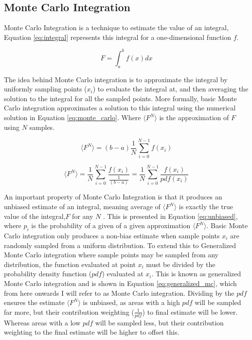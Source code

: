 \documentclass[../dissertation.tex]{subfiles}
\begin{document}
\subsection{Monte Carlo Integration}
\label{sec:monte_carlo_approx}
 Monte Carlo Integration is a technique to estimate the value of an integral, Equation \ref{eq:integral} represents this integral for a one-dimensional function $f$.

\begin{equation}
\label{eq:integral}
F = \int_a^b f(x) dx
\end{equation}

The idea behind Monte Carlo integration is to approximate the integral by uniformly sampling points ($x_i$) to evaluate the integral at, and then averaging the solution to the integral for all the sampled points. More formally, basic Monte Carlo integration approximates a solution to this integral using the numerical solution in Equation \ref{eq:monte_carlo}. Where $\langle F^N \rangle$ is the approximation of $F$ using $N$ samples.

\begin{equation}
\label{eq:monte_carlo}
\langle F^N \rangle = (b - a) \frac{1}{N} \sum^{N-1}_{i=0} f(x_i)
\end{equation}

\begin{equation}
\label{eq:generalized_mc}
\langle F^N \rangle = \frac{1}{N} \sum^{N-1}_{i=0} \frac{f(x_i)}{\frac{1}{(b-a)}} 
 = \frac{1}{N} \sum^{N-1}_{i=0} \frac{f(x_i)}{pdf(x_i)}
\end{equation}

An important property of Monte Carlo Integration is that it produces an unbiased estimate of an integral, meaning average of $\langle F^N \rangle$ is exactly the true value of the integral,$F$ for any $N$ \cite{morokoff1995quasi}. This is presented in Equation \ref{eq:unbiased}, where $p_i$ is the probability of a given of a given approximation $\langle F^N \rangle$. Basic Monte Carlo integration only produces a non-bias estimate when sample points $x_i$ are randomly sampled from a uniform distribution. To extend this to Generalized Monte Carlo integration where sample points may be sampled from any distribution, the function evaluated at point $x_i$ must be divided by the probability density function ($pdf$) evaluated at $x_i$. This is known as generalized Monte Carlo integration and is shown in Equation \ref{eq:generalized_mc}, which from here onwards I will refer to as Monte Carlo integration. Dividing by the $pdf$ ensures the estimate $\langle F^N \rangle$ is unbiased, as areas with a high $pdf$ will be sampled far more, but their contribution weighting ($\frac{1}{pdf}$) to final estimate will be lower. Whereas areas with a low $pdf$ will be sampled less, but their contribution weighting to the final estimate will be higher to offset this.
\end{document}
